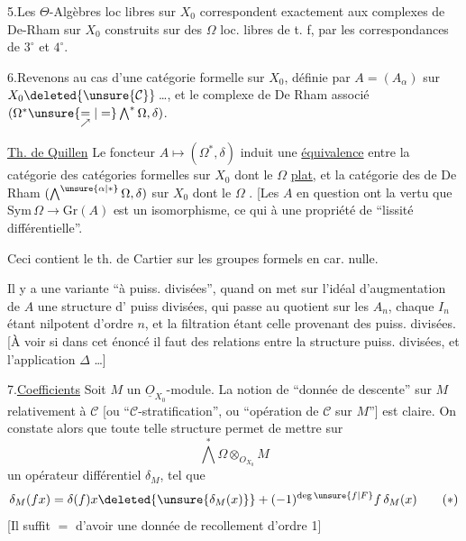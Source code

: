 
5.\quad Les $\Theta$-Algèbres loc libres  sur $X_0$ correspondent exactement aux complexes de De-Rham sur $X_0$ construits sur des $\Omega$ loc. libres de t. f, par les correspondances de $3^\circ$ et $4^\circ$.

6.\quad Revenons au cas d'une catégorie formelle sur $X_0$, définie par $A=(A_\alpha)$ sur $X_0\deleted{\unsure{\mathcal C}}$\,\ldots, et le complexe de De Rham associé $(\Omega^*\unsure{\underset{\nearrow}{=}|=}\bigwedge^*\Omega,\delta)$.

\uline{Th. de Quillen}  Le foncteur $A\longmapsto(\Omega^*,\delta)$ induit une \uline{équivalence} entre la catégorie des catégories formelles  sur $X_0$ dont le $\Omega$  \uline{plat}, et la catégorie des  de De Rham $(\bigwedge^{\unsure{\alpha|*}}\Omega,\delta)$ sur $X_0$ dont le $\Omega$  . [Les $A$ en question ont la vertu que $\mathrm{Sym}\,\Omega\longrightarrow\mathrm{Gr}(A)$ est un isomorphisme, ce qui  à une propriété de ``lissité différentielle''.

Ceci contient le th. de Cartier sur les groupes formels en car. nulle.

Il y a une variante ``à puiss. divisées'', quand on met sur l'idéal d'augmentation de $A$  une structure d' puiss divisées, qui passe au quotient sur les $A_n$, chaque $I_n$ étant nilpotent d'ordre $n$, et la filtration étant celle provenant des puiss. divisées. [À voir si dans cet énoncé il faut  des relations entre la structure  puiss. divisées, et l'application $\Delta$ \ldots]


7.\quad \uline{Coefficients}  Soit $M$ un $\underline O_{X_0}$-module. La notion de ``donnée de descente'' sur $M$ relativement à $\mathcal C$ [ou ``$\mathcal C$-stratification'', ou ``opération de $\mathcal C$ sur $M$''] est claire. On constate alors que toute telle structure permet de mettre sur
\[
\bigwedge^*\Omega\otimes_{O_{X_0}}M
\]
un opérateur différentiel $\delta_M$, tel que
\[
\delta_M(fx)=\delta(f)x\deleted{\unsure{\delta_M(x)}}+(-1)^{\deg\unsure{f|F}}f\,\delta_M(x)
\tag*{$(*)$}
\]
[Il suffit $=$ d'avoir une donnée de recollement d'ordre 1]

